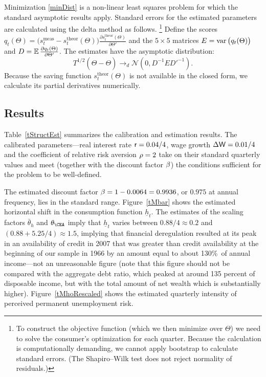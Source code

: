 \documentclass[titlepage]{\econtex}
\begin{document}
Minimization \eqref{minDist} is a non-linear least squares problem for which the standard asymptotic results apply. Standard errors for the estimated parameters are calculated using the delta method as follows.%
\footnote{To construct the objective function (which we then minimize over $\Theta$) we need to solve the consumer's optimization for each quarter. Because the calculation is computationally demanding, we cannot apply bootstrap to calculate standard errors. (The Shapiro--Wilk test does not reject normality of residuals.)
}
Define the scores $q_t(\Theta)=\big(s_{t}^{\text{meas}}-s_t^{\text{theor}}(\Theta)\big)\frac{\partial s_t^{\text{theor}}(\Theta)}{\partial \Theta'}$ and the $5\times5$ matrices $E=\operatorname{var}\big(q_t(\Theta)\big)$ and $D=\operatorname{\mathbb{E}}\frac{\partial q_t(\Theta)}{\partial \Theta'}$. The estimates have the asymptotic distribution:
$$
T^{1/2}(\hat{\Theta}-\Theta)\rightarrow_d \mathscr{N}(0, D^{-1}ED'^{-1}).
$$
Because the saving function $s_t^{\text{theor}}(\Theta)$ is not available in the closed form, we calculate its partial derivatives numerically.

\subsection{Results}

Table~\ref{tStructEst} summarizes the calibration and estimation results. The calibrated parameters---real interest rate $\mathsf{r}=0.04/4$, wage growth $\Delta\mathsf{W}=0.01/4$ and the coefficient of relative risk aversion $\rho=2$ take on their standard quarterly values and meet (together with the discount factor $\beta$) the conditions sufficient for the problem to be well-defined.

The estimated discount factor $\beta=1-0.0064=0.9936$, or $0.975$ at annual frequency, lies in the standard range.
Figure~\ref{tMbar} shows the estimated horizontal shift in the consumption function $\underline{h}_t$. The estimates of the scaling factors $\bar{\theta}_h$ and ${\theta}_\CEA$ imply that $\underline{h}_t$ varies between $0.88/4\approx0.2$ and $(0.88+5.25/4)\approx1.5$, implying that financial deregulation resulted at its peak in an availability of credit in 2007 that was greater than credit availability at the beginning of our sample in 1966 by an amount equal to about 130\%\ of annual income---not an unreasonable figure (note that this figure should not be compared with the aggregate debt ratio, which peaked at around 135 percent of disposable income, but with the total amount of net wealth which is substantially higher).
Figure~\ref{tMhoRescaled} shows the estimated quarterly intensity of perceived permanent unemployment risk.
\end{document}
